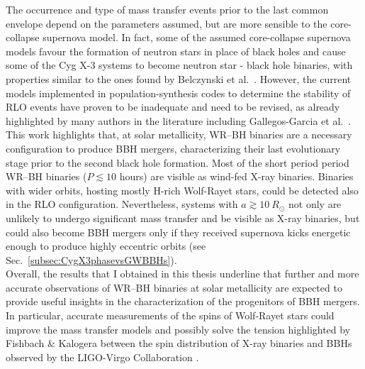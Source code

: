 \documentclass[a4paper,titlepage]{book}     	%
\newcommand{\rsun}{R_{\odot}}
\begin{document}
The occurrence and type of mass transfer events prior to the last common envelope depend on the parameters assumed, but are more sensible to the core-collapse supernova model. In fact, some of the assumed core-collapse supernova models favour the formation of neutron stars in place of black holes and cause some of the Cyg X-3 systems to become neutron star - black hole binaries, with properties similar to the ones found by Belczynski et al.\ \cite{Belczynski2013_CygX-3fate}. However, the current models implemented in population-synthesis codes to determine the stability of RLO events have proven to be inadequate and need to be revised, as already highlighted by many authors in the literature including Gallegos-Garcia et al.\  \cite{gallegos2021MESAvspopsynth}.\\

This work highlights that, at solar metallicity, WR--BH binaries are a necessary configuration to produce BBH mergers, characterizing their last evolutionary stage prior to the second black hole formation. Most of the short period period WR--BH binaries ($P \lesssim 10$ hours) are visible as wind-fed X-ray binaries. Binaries with wider orbits, hosting mostly H-rich Wolf-Rayet stars, could be detected also in the RLO configuration. Nevertheless, systems with $a \gtrsim 10~\rsun$ not only are unlikely to undergo significant mass transfer and be visible as X-ray binaries, but could also become BBH mergers only if they received supernova kicks energetic enough to produce highly eccentric orbits  (see Sec.\ \ref{subsec:CygX3phasevsGWBBHs}).\\


Overall, the results that I obtained in this thesis underline that further and more accurate observations of WR--BH binaries at solar metallicity are expected to provide useful insights in the characterization of the progenitors of BBH mergers. In particular, accurate measurements of the spins of  Wolf-Rayet stars could improve the mass transfer models and possibly solve the tension highlighted by Fishbach \& Kalogera between the spin distribution of X-ray binaries and BBHs observed by the LIGO-Virgo Collaboration \cite{HMXBH_spins2021}.
\end{document}
